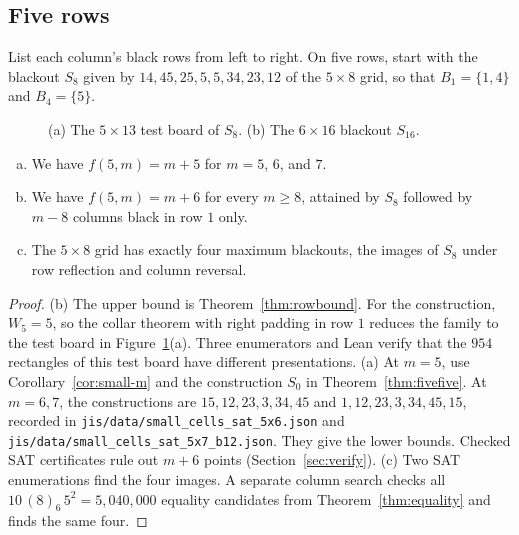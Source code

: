 \subsection{Five rows}

List each column's black rows from left to right. On five rows, start with
the blackout $S_8$ given by $14,\allowbreak 45,\allowbreak 25,\allowbreak 5,\allowbreak 5,\allowbreak 34,\allowbreak 23,\allowbreak 12$ of the $5\times8$ grid, so that $B_1=\{1,4\}$ and $B_4=\{5\}$.

\begin{figure}[!t]
\centering

\par\medskip

\caption{(a) The $5\times13$ test board of $S_8$. (b) The $6\times16$ blackout $S_{16}$.}
\label{fig:boards}
\end{figure}

\begin{theorem}\label{thm:fiverow}
\leavevmode
\begin{enumerate}[(a)]
\item We have $f(5,m)=m+5$ for $m=5$, $6$, and $7$.
\item We have $f(5,m)=m+6$ for every $m\ge8$, attained by $S_8$ followed by $m-8$ columns black in
row $1$ only.
\item The $5\times8$ grid has exactly four maximum blackouts, the images of $S_8$ under row
reflection and column reversal.
\end{enumerate}
\end{theorem}

\begin{proof}
(b) The upper bound is Theorem~\ref{thm:rowbound}.
For the construction, $W_5=5$, so the collar theorem with right padding
in row $1$ reduces the family to the test board in Figure~\ref{fig:boards}(a).
Three enumerators and Lean verify that the $954$ rectangles of this
test board have different presentations.
(a) At $m=5$, use Corollary~\ref{cor:small-m} and the construction $S_0$
in Theorem~\ref{thm:fivefive}. At $m=6,7$, the constructions are
$15,\allowbreak 12,\allowbreak 23,\allowbreak 3,\allowbreak 34,\allowbreak 45$ and
$1,\allowbreak 12,\allowbreak 23,\allowbreak 3,\allowbreak 34,\allowbreak 45,\allowbreak 15$,
recorded in \nolinkurl{jis/data/small_cells_sat_5x6.json} and
\nolinkurl{jis/data/small_cells_sat_5x7_b12.json}. They give the lower
bounds. Checked SAT certificates rule out $m+6$ points
(Section~\ref{sec:verify}).
(c) Two SAT enumerations find the four images. A separate column search
checks all $10\,(8)_6\,5^2=5{,}040{,}000$ equality candidates from
Theorem~\ref{thm:equality} and finds the same four.
\end{proof}

